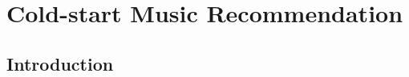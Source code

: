 
\chapter{Cold-start Music Recommendation}
\label{sec:cold-rec}

\section{Introduction}
\label{sec:cold-rec:introduction}
